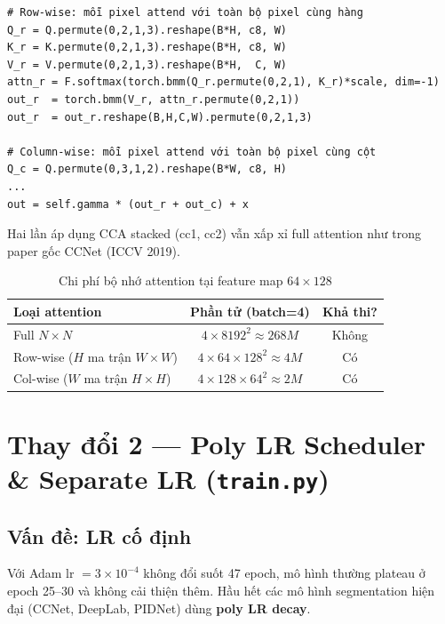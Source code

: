 \documentclass[12pt,a4paper]{article}
\begin{document}
\begin{lstlisting}[caption={Row + column attention thay thế full N×N}]
# Row-wise: mỗi pixel attend với toàn bộ pixel cùng hàng
Q_r = Q.permute(0,2,1,3).reshape(B*H, c8, W)
K_r = K.permute(0,2,1,3).reshape(B*H, c8, W)
V_r = V.permute(0,2,1,3).reshape(B*H,  C, W)
attn_r = F.softmax(torch.bmm(Q_r.permute(0,2,1), K_r)*scale, dim=-1)
out_r  = torch.bmm(V_r, attn_r.permute(0,2,1))
out_r  = out_r.reshape(B,H,C,W).permute(0,2,1,3)

# Column-wise: mỗi pixel attend với toàn bộ pixel cùng cột
Q_c = Q.permute(0,3,1,2).reshape(B*W, c8, H)
...
out = self.gamma * (out_r + out_c) + x
\end{lstlisting}

Hai lần áp dụng CCA stacked (cc1, cc2) vẫn xấp xỉ full attention như trong paper
gốc CCNet (ICCV 2019).

\begin{table}[H]
  \centering
  \caption{Chi phí bộ nhớ attention tại feature map $64\times128$}
  \begin{tabular}{lcc}
    \toprule
    \textbf{Loại attention} & \textbf{Phần tử (batch=4)} & \textbf{Khả thi?} \\
    \midrule
    Full $N\times N$ & $4 \times 8192^2 \approx 268M$ & Không \\
    Row-wise ($H$ ma trận $W\times W$) & $4\times64\times128^2 \approx 4M$ & Có \\
    Col-wise ($W$ ma trận $H\times H$) & $4\times128\times64^2 \approx 2M$ & Có \\
    \bottomrule
  \end{tabular}
\end{table}

\section{Thay đổi 2 — Poly LR Scheduler \& Separate LR (\texttt{train.py})}

\subsection{Vấn đề: LR cố định}

Với Adam lr $= 3\times10^{-4}$ không đổi suốt 47 epoch, mô hình thường plateau
ở epoch 25–30 và không cải thiện thêm. Hầu hết các mô hình segmentation hiện đại
(CCNet, DeepLab, PIDNet) dùng \textbf{poly LR decay}.
\end{document}
